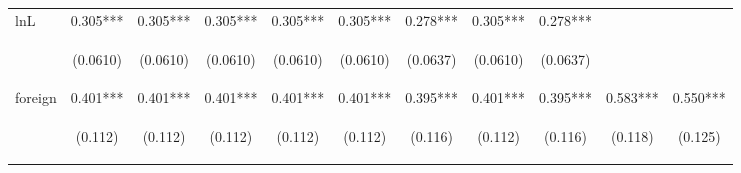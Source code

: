 \begin{center}
\begin{tabular}{lcccccccccc}
lnL & 0.305*** & 0.305*** & 0.305*** & 0.305*** & 0.305*** & 0.278*** & 0.305*** & 0.278*** &  &  \\
\vspace{4pt} & \begin{footnotesize}(0.0610)\end{footnotesize} & \begin{footnotesize}(0.0610)\end{footnotesize} & \begin{footnotesize}(0.0610)\end{footnotesize} & \begin{footnotesize}(0.0610)\end{footnotesize} & \begin{footnotesize}(0.0610)\end{footnotesize} & \begin{footnotesize}(0.0637)\end{footnotesize} & \begin{footnotesize}(0.0610)\end{footnotesize} & \begin{footnotesize}(0.0637)\end{footnotesize} & \begin{footnotesize}\end{footnotesize} & \begin{footnotesize}\end{footnotesize} \\
foreign & 0.401*** & 0.401*** & 0.401*** & 0.401*** & 0.401*** & 0.395*** & 0.401*** & 0.395*** & 0.583*** & 0.550*** \\
\vspace{4pt} & \begin{footnotesize}(0.112)\end{footnotesize} & \begin{footnotesize}(0.112)\end{footnotesize} & \begin{footnotesize}(0.112)\end{footnotesize} & \begin{footnotesize}(0.112)\end{footnotesize} & \begin{footnotesize}(0.112)\end{footnotesize} & \begin{footnotesize}(0.116)\end{footnotesize} & \begin{footnotesize}(0.112)\end{footnotesize} & \begin{footnotesize}(0.116)\end{footnotesize} & \begin{footnotesize}(0.118)\end{footnotesize} & \begin{footnotesize}(0.125)\end{footnotesize} \\

\end{tabular}
\end{center}
